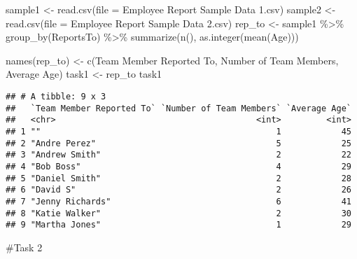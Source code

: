 \documentclass[
]{article}
\newenvironment{Shaded}{\begin{snugshade}}{\end{snugshade}}
\newcommand{\AttributeTok}[1]{\textcolor[rgb]{0.77,0.63,0.00}{#1}}
\newcommand{\FunctionTok}[1]{\textcolor[rgb]{0.00,0.00,0.00}{#1}}
\newcommand{\NormalTok}[1]{#1}
\newcommand{\OtherTok}[1]{\textcolor[rgb]{0.56,0.35,0.01}{#1}}
\newcommand{\SpecialCharTok}[1]{\textcolor[rgb]{0.00,0.00,0.00}{#1}}
\newcommand{\StringTok}[1]{\textcolor[rgb]{0.31,0.60,0.02}{#1}}
\begin{document}
\begin{Shaded}
\begin{Highlighting}[]
\NormalTok{sample1 }\OtherTok{\textless{}{-}} \FunctionTok{read.csv}\NormalTok{(}\AttributeTok{file =} \StringTok{\textquotesingle{}Employee Report Sample Data 1.csv\textquotesingle{}}\NormalTok{)}
\NormalTok{sample2 }\OtherTok{\textless{}{-}} \FunctionTok{read.csv}\NormalTok{(}\AttributeTok{file =} \StringTok{\textquotesingle{}Employee Report Sample Data 2.csv\textquotesingle{}}\NormalTok{)}
\NormalTok{rep\_to }\OtherTok{\textless{}{-}}\NormalTok{ sample1 }\SpecialCharTok{\%\textgreater{}\%}
  \FunctionTok{group\_by}\NormalTok{(ReportsTo) }\SpecialCharTok{\%\textgreater{}\%}
  \FunctionTok{summarize}\NormalTok{(}\FunctionTok{n}\NormalTok{(), }\FunctionTok{as.integer}\NormalTok{(}\FunctionTok{mean}\NormalTok{(Age)))}

\FunctionTok{names}\NormalTok{(rep\_to) }\OtherTok{\textless{}{-}} \FunctionTok{c}\NormalTok{(}\StringTok{\textquotesingle{}Team Member Reported To\textquotesingle{}}\NormalTok{, }\StringTok{\textquotesingle{}Number of Team Members\textquotesingle{}}\NormalTok{, }\StringTok{\textquotesingle{}Average Age\textquotesingle{}}\NormalTok{)}
\NormalTok{task1 }\OtherTok{\textless{}{-}}\NormalTok{ rep\_to}
\NormalTok{task1}
\end{Highlighting}
\end{Shaded}

\begin{verbatim}
## # A tibble: 9 x 3
##   `Team Member Reported To` `Number of Team Members` `Average Age`
##   <chr>                                        <int>         <int>
## 1 ""                                               1            45
## 2 "Andre Perez"                                    5            25
## 3 "Andrew Smith"                                   2            22
## 4 "Bob Boss"                                       4            29
## 5 "Daniel Smith"                                   2            28
## 6 "David S"                                        2            26
## 7 "Jenny Richards"                                 6            41
## 8 "Katie Walker"                                   2            30
## 9 "Martha Jones"                                   1            29
\end{verbatim}

\#Task 2
\end{document}
